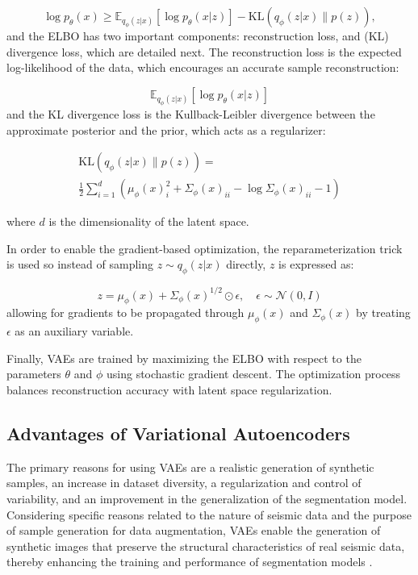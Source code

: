\documentclass{ieeeaccess}
\begin{document}
\begin{equation}
\log p_\theta(x) \geq \mathbb{E}_{q_\phi(z | x)} \left[ \log p_\theta(x | z) \right] - \text{KL}(q_\phi(z | x) \parallel p(z)),
\end{equation}
and the ELBO has two important components: reconstruction loss, and (KL) divergence loss, which are detailed next. The reconstruction loss is the expected log-likelihood of the data, which encourages an accurate sample reconstruction:

\begin{equation}
\mathbb{E}_{q_\phi(z | x)} \left[ \log p_\theta(x | z) \right]
\end{equation}
and the KL divergence loss is the Kullback-Leibler divergence between the approximate posterior and the prior, which acts as a regularizer:

\begin{equation}
\begin{aligned}
\text{KL}(q_\phi(z | x) \parallel p(z)) 
=  \\
\frac{1}{2} \sum_{i=1}^{d} \left( \mu_\phi(x)_i^2 + \Sigma_\phi(x)_{ii} - \log \Sigma_\phi(x)_{ii} - 1 \right)
\end{aligned}
\end{equation}

where $d$ is the dimensionality of the latent space.

In order to enable the gradient-based optimization, the reparameterization trick is used so instead of sampling $z \sim q_\phi(z | x)$ directly, $z$ is expressed as:

\begin{equation}
z = \mu_\phi(x) + \Sigma_\phi(x)^{1/2} \odot \epsilon, \quad \epsilon \sim \mathcal{N}(0, I)
\end{equation}
allowing for gradients to be propagated through $\mu_\phi(x)$ and $\Sigma_\phi(x)$ by treating $\epsilon$ as an auxiliary variable.

Finally, VAEs are trained by maximizing the ELBO with respect to the parameters $\theta$ and $\phi$ using stochastic gradient descent. The optimization process balances reconstruction accuracy with latent space regularization.

\subsection*{Advantages of Variational Autoencoders}
The primary reasons for using VAEs are a realistic generation of synthetic samples, an increase in dataset diversity, a regularization and control of variability, and an improvement in the generalization of the segmentation model. Considering specific reasons related to the nature of seismic data and the purpose of sample generation for data augmentation, VAEs enable the generation of synthetic images that preserve the structural characteristics of real seismic data, thereby enhancing the training and performance of segmentation models \cite{ref1} \cite{ref15} \cite{ref18}.
\end{document}

